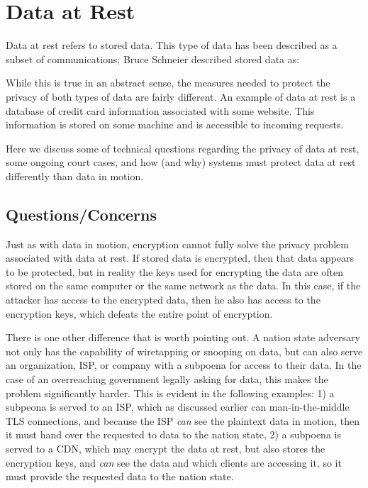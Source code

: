 \section{Data at Rest}
\label{sec:rest}

Data at rest refers to stored data. This type of data has been described as a subset of communications; Bruce Schneier described stored data as: 


While this is true in an abstract sense, the measures needed to protect the privacy of both types of data are fairly different.  An example of data at rest is a database of credit card information associated with some website.  This information is stored on some machine and is accessible to incoming requests.

Here we discuss some of technical questions regarding the privacy of data at rest, some ongoing court cases, and how (and why) systems must protect data at rest differently than data in motion.

\subsection{Questions/Concerns}  
Just as with data in motion, encryption cannot fully solve the privacy problem associated with data at rest.  If stored data is encrypted, then that data appears to be protected, but in reality the keys used for encrypting the data are often stored on the same computer or the same network as the data.  In this case, if the attacker has access to the encrypted data, then he also has access to the encryption keys, which defeats the entire point of encryption.  

There is one other difference that is worth pointing out.  A nation state adversary not only has the capability of wiretapping or snooping on data, but can also serve an organization, ISP, or company with a subpoena for access to their data.  In the case of an overreaching government legally asking for data, this makes the problem significantly harder.  This is evident in the following examples: 1) a subpeona is served to an ISP, which as discussed earlier can man-in-the-middle TLS connections, and because the ISP {\it can} see the plaintext data in motion, then it must hand over the requested to data to the nation state, 2) a subpoena is served to a CDN, which may encrypt the data at rest, but also stores the encryption keys, and {\it can} see the data and which clients are accessing it, so it must provide the requested data to the nation state.  

